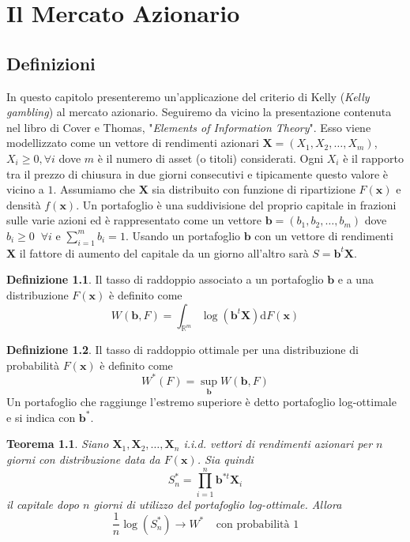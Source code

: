 \documentclass[a4paper,11pt]{book}
\theoremstyle{plain}
\newtheorem{teo}{Teorema}[chapter]
\theoremstyle{definition}
\newtheorem{defn}{Definizione}[chapter]
\theoremstyle{remark}
\newcommand{\R}{\mathbb{R}}
\newcommand{\dFX}{\text{d}F(\bm{x})}
\newcommand{\X}{\bm{X}}
\newcommand{\x}{\bm{x}}
\newcommand{\B}{\bm{b}}
\begin{document}
\chapter{Il Mercato Azionario}
\section{Definizioni}
In questo capitolo presenteremo un'applicazione del criterio di Kelly (\textit{Kelly gambling}) al mercato azionario. Seguiremo da vicino la presentazione contenuta nel libro di Cover e Thomas, "\textit{Elements of Information Theory}"\cite{CTElInfTeo}. Esso viene modellizzato come un vettore di rendimenti azionari $\bm{X}=(X_1,X_2, \ldots, X_m)$, $X_i\geq 0, \forall i$ dove $m$ è il numero di asset (o titoli) considerati. Ogni $X_i$ è il rapporto tra il prezzo di chiusura in due giorni consecutivi e tipicamente questo valore è vicino a $1$.\newline
Assumiamo che $\bm{X}$ sia distribuito con funzione di ripartizione $F(\bm{x})$ e densità $f(\bm{x})$.\newline
Un portafoglio è una suddivisione del proprio capitale in frazioni sulle varie azioni ed è rappresentato come un vettore $\bm{b}=(b_1,b_2,\ldots, b_m)$ dove $b_i\geq 0 \;\;\forall i$ e $\sum_{i = 1}^{m}{b_i} = 1$.\newline
Usando un portafoglio $\bm{b}$ con un vettore di rendimenti $\bm{X}$ il fattore di aumento del capitale da un giorno all'altro sarà $S=\bm{b}^t\bm{X}$.
\begin{defn}
	Il tasso di raddoppio associato a un portafoglio $\bm{b}$ e a una distribuzione $F(\bm{x})$ è definito come
	\begin{equation*}
		W(\bm{b},F) = \int_{\R^m}{\log(\bm{b}^t\bm{X})\dFX}
	\end{equation*}
\end{defn}
\begin{defn}
	Il tasso di raddoppio ottimale per una distribuzione di probabilità $F(\bm{x})$ è definito come
	\begin{equation*}
		W^*(F) = \sup\limits_{\bm{b}}W(\bm{b},F)
	\end{equation*}
	Un portafoglio che raggiunge l'estremo superiore è detto portafoglio log-ottimale e si indica con $\bm{b}^*$.
\end{defn}
\begin{teo}
	Siano $\X_1,\X_2,\ldots,\X_n$ i.i.d. vettori di rendimenti azionari per $n$ giorni con distribuzione data da $F(\x)$. Sia quindi
	\begin{equation*}
		S_n^*= \prod_{i = 1}^{n}{\B^{*t}\X_i}
	\end{equation*}
	il capitale dopo $n$ giorni di utilizzo del portafoglio log-ottimale. Allora
	\begin{equation*}
	\frac{1}{n}\log(S_n^*)\rightarrow W^* \;\;\;\; \text{con probabilità } 1
	\end{equation*}
\end{teo}
\end{document}
